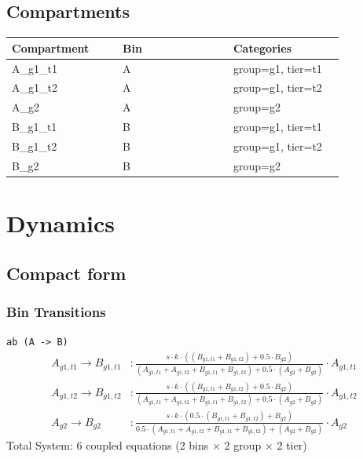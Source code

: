 \documentclass{article}
\begin{document}
\subsection*{Compartments}
\begin{longtable}{p{0.3\linewidth}p{0.3\linewidth}p{0.3\linewidth}}
Compartment & Bin & Categories \\
\hline
\endhead
A\_g1\_t1 & A & group=g1, tier=t1 \\
A\_g1\_t2 & A & group=g1, tier=t2 \\
A\_g2 & A & group=g2 \\
B\_g1\_t1 & B & group=g1, tier=t1 \\
B\_g1\_t2 & B & group=g1, tier=t2 \\
B\_g2 & B & group=g2 \\
\end{longtable}
\section*{Dynamics}
\subsection*{Compact form}
\subsubsection*{Bin Transitions}
\noindent\texttt{ab (A -\textgreater{} B)}
\begin{align*}
A_{g1,t1} \to B_{g1,t1} &: \frac{s \cdot k \cdot ((B_{g1,t1} + B_{g1,t2}) + 0.5 \cdot B_{g2})}{(A_{g1,t1} + A_{g1,t2} + B_{g1,t1} + B_{g1,t2}) + 0.5 \cdot (A_{g2} + B_{g2})} \cdot A_{g1,t1} \\
A_{g1,t2} \to B_{g1,t2} &: \frac{s \cdot k \cdot ((B_{g1,t1} + B_{g1,t2}) + 0.5 \cdot B_{g2})}{(A_{g1,t1} + A_{g1,t2} + B_{g1,t1} + B_{g1,t2}) + 0.5 \cdot (A_{g2} + B_{g2})} \cdot A_{g1,t2} \\
A_{g2} \to B_{g2} &: \frac{s \cdot k \cdot (0.5 \cdot (B_{g1,t1} + B_{g1,t2}) + B_{g2})}{0.5 \cdot (A_{g1,t1} + A_{g1,t2} + B_{g1,t1} + B_{g1,t2}) + (A_{g2} + B_{g2})} \cdot A_{g2}
\end{align*}
Total System: 6 coupled equations (2 bins $\times$ 2 group $\times$ 2 tier)
\end{document}
